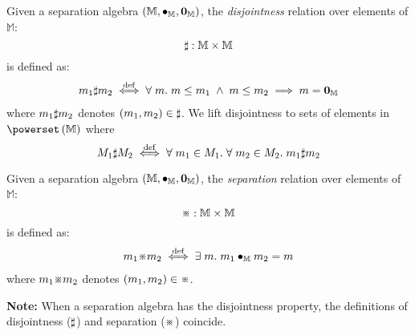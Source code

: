 %
%
\begin{definition}[Disjointness]
Given a separation algebra $\left(\mathbb{M}, \bullet_{\mathbb{M}}, \mathbf{0}_{\mathbb{M}} \right)$, the \emph{disjointness} relation over elements of $\mathbb{M}$:
%
\[
\sharp : \mathbb{M} \times \mathbb{M}
\]
%
is defined as:
%
\[
\begin{array}{l}
	m_1 \sharp m_2 \stackrel{\mathrm{def}}{\iff} \forall\; m.\; m \leq m_1 \;\land\; m \leq m_2 \implies m = \mathbf{0}_{\mathbb{M}}
\end{array}
\]
%
where $m_1 \sharp m_2$ denotes $(m_1, m_2) \in \sharp$. We lift disjointness to sets of elements in $\pset{\mathbb{M}}$ where
%
\[
	M_1 \sharp M_2 \stackrel{\mathrm{def}}{\iff} \forall\; m_1 \in M_1.\;\forall\; m_2 \in M_2.\; m_1 \sharp m_2
\]
%
\end{definition}
%
%
\begin{definition}[Separation]
Given a separation algebra $\left(\mathbb{M}, \bullet_{\mathbb{M}}, \mathbf{0}_{\mathbb{M}} \right)$, the \emph{separation} relation over elements of $\mathbb{M}$:
%
\[
\separate : \mathbb{M} \times \mathbb{M}
\]
%
is defined as:
%
\[
\begin{array}{l}
	m_1 \separate m_2 \iffdef \exsts{m} m_1 \compose{\mathbb{M}} m_2 = m 
\end{array}
\]
%
where $m_1 \separate m_2$ denotes $(m_1, m_2) \in \separate$. 
\end{definition}
%
%
\noindent\textbf{Note: } When a separation algebra has the disjointness property, the definitions of disjointness ($\sharp$) and separation ($\separate$) coincide.
%
%
